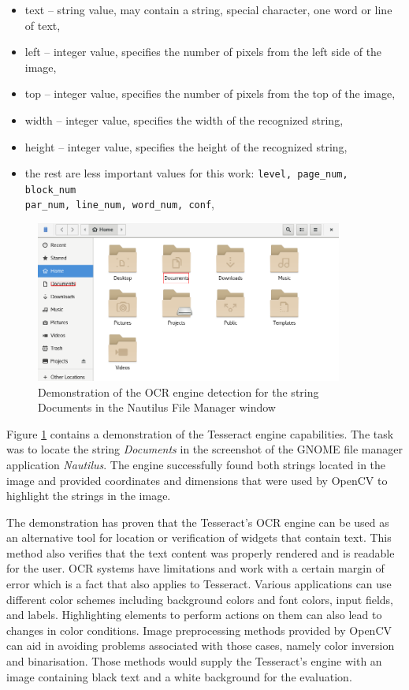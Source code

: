 \begin{itemize}
    \item text -- string value, may contain a string, special character, one word or line of text,
    \item left -- integer value, specifies the number of pixels from the left side of the image,
    \item top -- integer value, specifies the number of pixels from the top of the image,
    \item width -- integer value, specifies the width of the recognized string, 
    \item height -- integer value, specifies the height of the recognized string,
    \item the rest are less important values for this work: \verb|level, page_num, block_num| \\ \verb|par_num, line_num, word_num, conf|,
\end{itemize}

\begin{figure}[H]
	\centering
	\includegraphics[width=0.9\textwidth]{obrazky-figures/ocr+nautilus.png}
	\caption{Demonstration of the OCR engine detection for the string Documents in the Nautilus File Manager window}
	\label{ocr_nautilus}
\end{figure}

Figure \ref{ocr_nautilus} contains a demonstration of the Tesseract engine capabilities. The task was to locate the string \textit{Documents} in the screenshot of the GNOME file manager application \textit{Nautilus}. The engine successfully found both strings located in the image and provided coordinates and dimensions that were used by OpenCV to highlight the strings in the image. 

The demonstration has proven that the Tesseract's OCR engine can be used as an alternative tool for location or verification of widgets that contain text. This method also verifies that the text content was properly rendered and is readable for the user. OCR systems have limitations and work with a certain margin of error which is a fact that also applies to Tesseract. Various applications can use different color schemes including background colors and font colors, input fields, and labels. Highlighting elements to perform actions on them can also lead to changes in color conditions. Image preprocessing methods provided by OpenCV can aid in avoiding problems associated with those cases, namely color inversion and binarisation. Those methods would supply the Tesseract's engine with an image containing black text and a white background for the evaluation.

